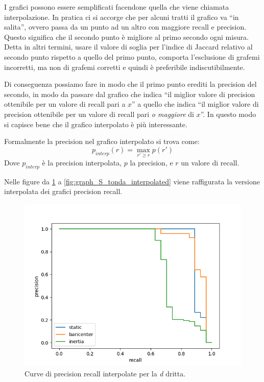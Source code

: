 I grafici possono essere semplificati facendone quella che viene chiamata interpolazione. In pratica ci si accorge che per alcuni tratti il grafico va ``in salita'', ovvero passa da un punto ad un altro con maggiore recall e precision. Questo significa che il secondo punto \`e migliore al primo secondo ogni misura. Detta in altri termini, usare il valore di soglia per l'indice di Jaccard relativo al secondo punto rispetto a quello del primo punto, comporta l'esclusione di grafemi incorretti, ma non di grafemi corretti e quindi \`e preferibile indiscutibilmente.

Di conseguenza possiamo fare in modo che il primo punto erediti la precision del secondo, in modo da passare dal grafico che indica ``il miglior valore di precision ottenibile per un valore di recall pari a $x$'' a quello che indica ``il miglior valore di precision ottenibile per un valore di recall pari \emph{o maggiore} di $x$''. In questo modo si capisce bene che il grafico interpolato \`e pi\`u interessante.

Formalmente la precision nel grafico interpolato si trova come:
\begin{equation*}
    p_{interp}(r) = \max_{r' \geq r} p(r')
\end{equation*}
Dove $p_{interp}$ \`e la precision interpolata, $p$ la precision, e $r$ un valore di recall.

Nelle figure da \ref{fig:graph_D_dritta_interpolated} a \ref{fig:graph_S_tonda_interpolated} viene raffigurata la versione interpolata dei grafici precision recall.

\begin{figure}
    \centering
    \includegraphics[width=.9\textwidth]{figures/graphs/D_drittaFalseinterpolated.png}
    \caption{Curve di precision recall interpolate per la \emph{d} dritta.}
    \label{fig:graph_D_dritta_interpolated}
\end{figure}

